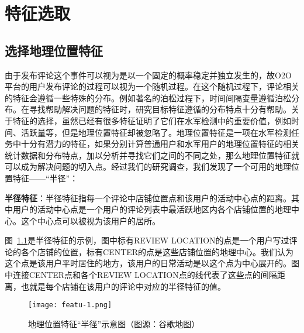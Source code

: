 
\chapter{特征选取}
\label{chap:Featu}



\section{选择地理位置特征}

由于发布评论这个事件可以视为是以一个固定的概率稳定并独立发生的，故O2O平台的用户发布评论的过程可以视为一个随机过程。在这个随机过程下，评论相关的特征会遵循一些特殊的分布。例如著名的泊松过程下，时间间隔变量遵循泊松分布。在寻找帮助解决问题的特征时，研究目标特征遵循的分布特点十分有帮助。关于特征的选择，虽然已经有很多特征证明了它们在水军检测中的重要价值，例如时间、活跃量等，但是地理位置特征却被忽略了。地理位置特征是一项在水军检测任务中十分有潜力的特征，如果分别计算普通用户和水军用户的地理位置特征的相关统计数据和分布特点，加以分析并寻找它们之间的不同之处，那么地理位置特征就可以成为解决问题的切入点。经过我们的研究调查，我们发现了一个可用的地理位置特征——“半径”：

\begin{defn}
	\textbf{半径特征}：半径特征指每一个评论中店铺位置点和该用户的活动中心点的距离。其中用户的活动中心点是一个用户的评论列表中最活跃地区内各个店铺位置的地理中心。这个中心点可以被视为该用户的居所。
\end{defn}

图~\ref{fig:radius}是半径特征的示例，图中标有REVIEW LOCATION的点是一个用户写过评论的各个店铺的位置，标有CENTER的点是这些店铺位置的地理中心。我们认为这个点是该用户平时居住的地方，该用户的日常活动是以这个点为中心展开的。图中连接CENTER点和各个REVIEW LOCATION点的线代表了这些点的间隔距离，也就是每个店铺在该用户的评论中对应的半径特征的值。

\begin{figure}[htbp]
	\centering
	\begin{minipage}[htbp]{\textwidth}
		\centering
		\texttt{[image: featu-1.png]}
		\caption[地理位置特征“半径”示意图]
		{地理位置特征“半径”示意图（图源：谷歌地图）\label{fig:radius}}		
	\end{minipage}     
\end{figure}



